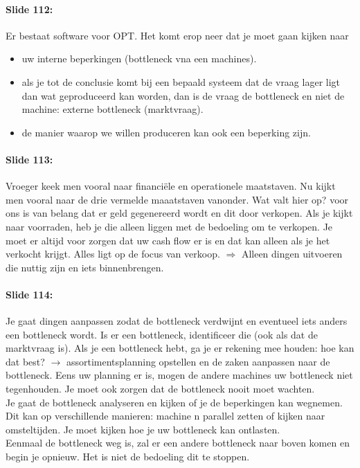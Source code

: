 \documentclass[10pt,a4paper]{report}
\begin{document}
\paragraph{Slide 112:} Er bestaat software voor OPT. Het komt erop neer dat je moet gaan kijken naar 
\begin{itemize}
\item uw interne beperkingen (bottleneck vna een machines).
\item als je tot de conclusie komt bij een bepaald systeem dat de vraag lager ligt dan wat geproduceerd kan worden, dan is de vraag de bottleneck en niet de machine: externe bottleneck (marktvraag). 
\item de manier waarop we willen produceren kan ook een beperking zijn.
\end{itemize}

\paragraph{Slide 113:} Vroeger keek men vooral naar financi\"ele en operationele maatstaven. Nu kijkt men vooral naar de drie vermelde maaatstaven vanonder. Wat valt hier op? voor ons is van belang dat er geld gegenereerd wordt en dit door verkopen. Als je kijkt naar voorraden, heb je die alleen liggen met de bedoeling om te verkopen. Je moet er altijd voor zorgen dat uw cash flow er is en dat kan alleen als je het verkocht krijgt. Alles ligt op de focus van verkoop. $\Rightarrow$ Alleen dingen uitvoeren die nuttig zijn en iets binnenbrengen.

\paragraph{Slide 114:} Je gaat dingen aanpassen zodat de bottleneck verdwijnt en eventueel iets anders een bottleneck wordt. Is er een bottleneck, identificeer die (ook als dat de marktvraag is). Als je een bottleneck hebt, ga je er rekening mee houden: hoe kan dat best? $\rightarrow$ assortimentsplanning opstellen en de zaken aanpassen naar de bottleneck. Eens uw planning er is, mogen de andere machines uw bottleneck niet tegenhouden. Je moet ook zorgen dat de bottleneck nooit moet wachten.\\
Je gaat de bottleneck analyseren en kijken of je de beperkingen kan wegnemen. Dit kan op verschillende manieren: machine n parallel zetten of kijken naar omsteltijden. Je moet kijken hoe je uw bottleneck kan ontlasten.\\
Eenmaal de bottleneck weg is, zal er een andere bottleneck naar boven komen en begin je opnieuw. Het is niet de bedoeling dit te stoppen.
\end{document}
